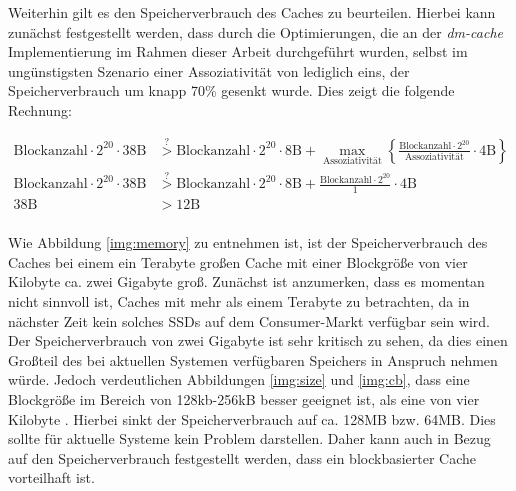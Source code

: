 Weiterhin gilt es den Speicherverbrauch des Caches zu beurteilen. Hierbei kann zunächst festgestellt werden, dass durch die Optimierungen, die an der
\textit{dm-cache} Implementierung im Rahmen dieser Arbeit durchgeführt wurden, selbst im ungünstigsten Szenario einer Assoziativität von lediglich eins, der
Speicherverbrauch um knapp 70\% gesenkt wurde. Dies zeigt die folgende Rechnung:

\[
\begin{split}
\text{Blockanzahl} \cdot 2^{20} \cdot 38 \text{B} & \stackrel{?}{>} \text{Blockanzahl} \cdot 2^{20} \cdot 8 \text{B} + \max_\text{Assoziativität} \left\{
\frac{\displaystyle \text{Blockanzahl} \cdot 2^{20}}{\displaystyle \text{Assoziativität}} \cdot 4 \text{B} \right\} \\
\text{Blockanzahl} \cdot 2^{20} \cdot 38 \text{B} & \stackrel{?}{>} \text{Blockanzahl} \cdot 2^{20} \cdot 8 \text{B} + \frac{\displaystyle \text{Blockanzahl} \cdot 2^{20}}{\displaystyle 1} \cdot 4 \text{B}\\
38 \text{B} & > 12 \text{B}\\
\end{split}
\]

Wie Abbildung \ref{img:memory} zu entnehmen ist, ist der Speicherverbrauch des Caches bei einem ein Terabyte großen Cache mit einer Blockgröße von vier Kilobyte
ca. zwei Gigabyte groß. Zunächst ist anzumerken, dass es momentan nicht sinnvoll ist, Caches mit mehr als einem Terabyte zu betrachten, da in nächster Zeit
kein solches \acp{SSD} auf dem Consumer-Markt verfügbar sein wird. Der Speicherverbrauch von zwei Gigabyte ist sehr kritisch zu sehen, da dies einen Großteil
des bei aktuellen Systemen verfügbaren Speichers in Anspruch nehmen würde. Jedoch verdeutlichen Abbildungen \ref{img:size} und \ref{img:cb}, dass eine
Blockgröße im Bereich von 128kb-256kB besser geeignet ist, als eine von vier Kilobyte . Hierbei sinkt der Speicherverbrauch auf ca. 128MB bzw. 64MB. Dies
sollte für aktuelle Systeme kein Problem darstellen. Daher kann auch in Bezug auf den Speicherverbrauch festgestellt werden, dass ein blockbasierter Cache
vorteilhaft ist.
